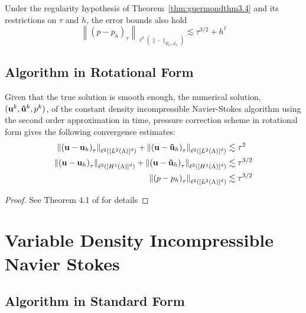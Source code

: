 \documentclass[letterpaper]{erdc}
\begin{document}
\begin{theorem}\label{thm:guermondthm3.5}
Under the regularity hypothesis of Theorem~\ref{thm:guermondthm3.4} and its restrictions on $\tau$ and $h$, the error bounds also hold
    \begin{equation}
      \left\| \left(p - p_h \right)_{\tau} \right\|_{\ell^{2}\left(\|\cdot\|_{B_h, \mathcal{A}_h}\right)} \lesssim \tau^{3/2} + h^{\ell}
    \end{equation}
\end{theorem}


%
%
\subsection{Algorithm in Rotational Form}

\begin{theorem}
Given that the true solution is smooth enough, the numerical solution, $(\textbf{u}^k, \mathbf{\tilde{u}}^k, p^k)$, of the constant density incompressible Navier-Stokes algorithm using the second order approximation in time, pressure correction scheme in rotational form gives the following convergence estimates:
\begin{align*}
\left\| \left(\textbf{u} - \textbf{u}_h\right)_{\tau} \right\|_{\ell^2\left([L^2(\Lambda)]^d \right)} + \left\| \left(\textbf{u} - \mathbf{\tilde{u}}_h\right)_{\tau} \right\|_{\ell^2\left([L^2(\Lambda)]^d \right)} &\lesssim \tau^2\\
\left\| \left(\textbf{u} - \textbf{u}_h\right)_{\tau} \right\|_{\ell^2\left([H^1(\Lambda)]^d \right)} + \left\| \left(\textbf{u} - \mathbf{\tilde{u}}_h\right)_{\tau} \right\|_{\ell^2\left([H^1(\Lambda)]^d \right)}  &\lesssim \tau^{3/2}\\
 \left\| \left(p - p_h\right)_{\tau} \right\|_{\ell^2\left([L^2(\Lambda)]^d \right)} &\lesssim \tau^{3/2}
\end{align*}

\end{theorem}
\begin{proof}
See Theorem 4.1 of \cite{guermond2004error} for details
\end{proof}


%
%
%
\section{Variable Density Incompressible Navier Stokes}

%
%
\subsection{Algorithm in Standard Form}
\end{document}
